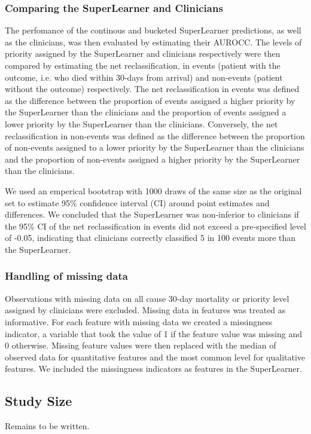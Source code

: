 \documentclass[10pt,letterpaper]{article}\usepackage[]{graphicx}\usepackage[]{color}
\begin{document}
\subsubsection*{Comparing the SuperLearner and Clinicians}
The perfomance of the continous and bucketed SuperLearner predictions, as well
as the clinicians, was then evaluated by estimating their AUROCC. The levels of
priority assigned by the SuperLearner and clinicians respectively were then
compared by estimating the net reclassification, in events (patient with the
outcome, i.e. who died within 30-days from arrival) and non-events (patient
without the outcome) respectively. The net reclassification in events was
defined as the difference between the proportion of events assigned a higher
priority by the SuperLearner than the clinicians and the proportion of events
assigned a lower priority by the SuperLearner than the clinicians. Conversely,
the net reclassification in non-events was defined as the difference between the
proportion of non-events assigned to a lower priority by the SuperLearner than
the clinicians and the proportion of non-events assigned a higher priority by
the SuperLearner than the clinicians.

We used an emperical bootstrap with 1000 draws of the same size as the original
set to estimate 95\% confidence interval (CI) around point estimates and
differences. We concluded that the SuperLearner was non-inferior to clinicians
if the 95\% CI of the net reclassification in events did not exceed a
pre-specified level of -0.05, indicating that clinicians correctly classified 5
in 100 events more than the SuperLearner.

\subsubsection*{Handling of missing data}
Observations with missing data on all cause 30-day mortality or priority level
assigned by clinicians were excluded. Missing data in features was treated as
informative. For each feature with missing data we created a missingness
indicator, a variable that took the value of 1 if the feature value was missing
and 0 otherwise. Missing feature values were then replaced with the median of
observed data for quantitative features and the most common level for
qualitative features. We included the missingness indicators as features in the
SuperLearner.

\subsection*{Study Size}
Remains to be written.
\end{document}
